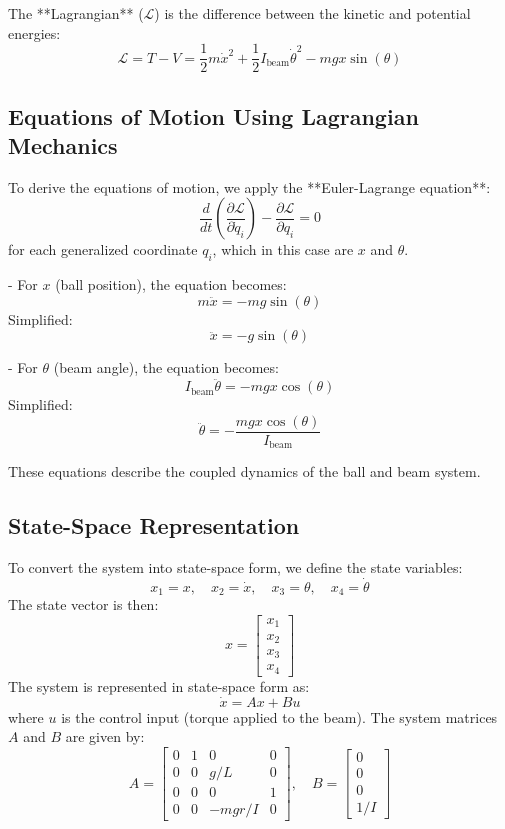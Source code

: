 \documentclass[conference]{IEEEtran}
\begin{document}
The **Lagrangian** (\(\mathcal{L}\)) is the difference between the kinetic and potential energies:
\[
\mathcal{L} = T - V = \frac{1}{2} m \dot{x}^2 + \frac{1}{2} I_{\text{beam}} \dot{\theta}^2 - m g x \sin(\theta)
\]

\subsection{Equations of Motion Using Lagrangian Mechanics}
To derive the equations of motion, we apply the **Euler-Lagrange equation**:
\[
\frac{d}{dt} \left( \frac{\partial \mathcal{L}}{\partial \dot{q}_i} \right) - \frac{\partial \mathcal{L}}{\partial q_i} = 0
\]
for each generalized coordinate \(q_i\), which in this case are \(x\) and \(\theta\).

- For \(x\) (ball position), the equation becomes:
  \[
  m \ddot{x} = - m g \sin(\theta)
  \]
  Simplified:
  \[
  \ddot{x} = - g \sin(\theta)
  \]

- For \(\theta\) (beam angle), the equation becomes:
  \[
  I_{\text{beam}} \ddot{\theta} = - m g x \cos(\theta)
  \]
  Simplified:
  \[
  \ddot{\theta} = - \frac{m g x \cos(\theta)}{I_{\text{beam}}}
  \]

These equations describe the coupled dynamics of the ball and beam system.

\subsection{State-Space Representation}
To convert the system into state-space form, we define the state variables:
\[
x_1 = x, \quad x_2 = \dot{x}, \quad x_3 = \theta, \quad x_4 = \dot{\theta}
\]
The state vector is then:
\[
x = \begin{bmatrix} x_1 \\ x_2 \\ x_3 \\ x_4 \end{bmatrix}
\]
The system is represented in state-space form as:
\[
\dot{x} = A x + B u
\]
where \(u\) is the control input (torque applied to the beam). The system matrices \(A\) and \(B\) are given by:
\[
A = \begin{bmatrix}
0 & 1 & 0 & 0 \\
0 & 0 & g/L & 0 \\
0 & 0 & 0 & 1 \\
0 & 0 & -m g r/I & 0
\end{bmatrix}, \quad B = \begin{bmatrix} 0 \\ 0 \\ 0 \\ 1/I \end{bmatrix}
\]
\end{document}
